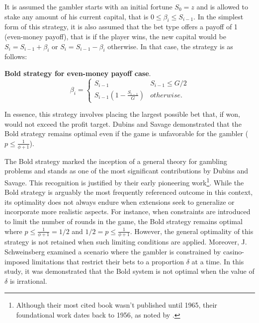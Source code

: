 \documentclass[11pt,twoside]{article}
\numberwithin{Theorem}{section}
\numberwithin{Definition}{section}
\numberwithin{Lemma}{section}
\numberwithin{Algorithm}{section}
\numberwithin{equation}{section}
\begin{document}
It is assumed the gambler starts with an initial fortune $S_{0} =z$ and is allowed to stake any amount of his current capital, that is $0\leq \beta_{i} \leq S_{i-1}$. In the simplest form of this strategy, it is also assumed that the bet type offers a payoff of 1 (even-money payoff), that is if the player wins, the new capital would be $S_{i} = S_{i-1} + \beta_{i}$ or $S_{i} = S_{i-1} - \beta_{i}$ otherwise. In that case, the strategy is as follows:
\begin{tcolorbox}[colback=gray!10,boxrule=0.25pt]
\textbf{Bold strategy for even-money payoff case}.\\
\begin{equation*}\label{strategy_bold}
\beta_{i} = \left\{
\begin{array}{ll}
S_{i-1}&  S_{i-1} \leq G/2\\
S_{i-1}\left( 1  - \frac{S_{i-1}}{G}\right) & otherwise.
\end{array}
\right.
\end{equation*}
\end{tcolorbox}

In essence, this strategy involves placing the largest possible bet that, if won, would not exceed the profit target. Dubins and Savage demonstrated that the Bold strategy remains optimal even if the game is unfavorable for the gambler ($p \leq \frac{1}{\phi + 1}$).

The Bold strategy marked the inception of a general theory for gambling problems and stands as one of the most significant contributions by Dubins and Savage. This recognition is justified by their early pioneering work\footnote{Although their most cited book wasn't published until 1965, their foundational work dates back to 1956, as noted by \cite{Breiman_1961}.}. While the Bold strategy is arguably the most frequently referenced outcome in this context, its optimality does not always endure when extensions seek to generalize or incorporate more realistic aspects\cite{Yao, Wilkins}. For instance, when constraints are introduced to limit the number of rounds in the game, the Bold strategy remains optimal where $p \leq \frac{1}{\phi + 1} = 1/2 $ and $1/2 = p \leq \frac{1}{\phi + 1}$. However, the general optimality of this strategy is not retained when such limiting conditions are applied. Moreover, J. Schweinsberg\cite{Schweinsberg_2005} examined a scenario where the gambler is constrained by casino-imposed limitations that restrict their bets to a proportion $\delta$ at a time. In this study, it was demonstrated that the Bold system is not optimal when the value of $\delta$ is irrational.
\end{document}
